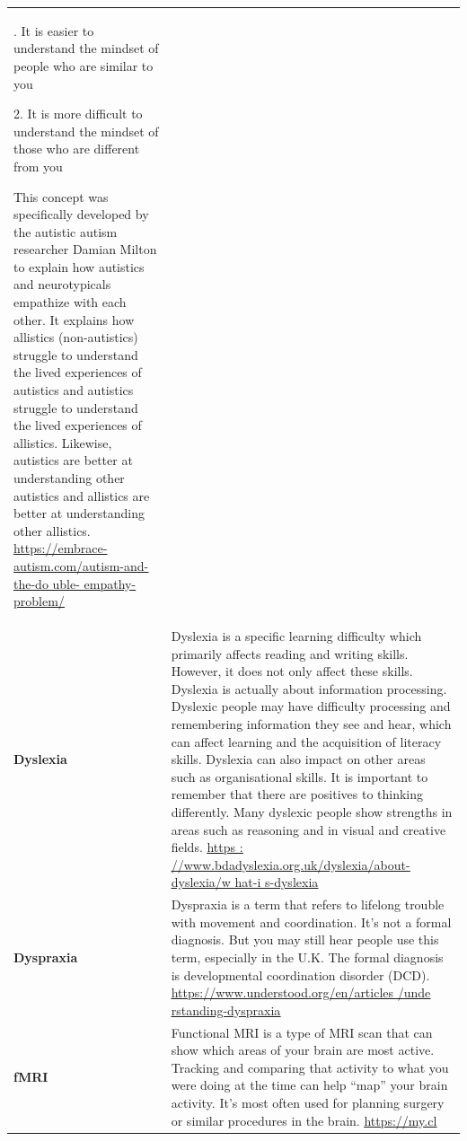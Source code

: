 \documentclass[
  letterpaper,
  DIV=11,
  numbers=noendperiod]{scrreprt}
\begin{document}
\begin{longtable}[]{@{}
  >{\raggedright\arraybackslash}p{}
  >{\raggedright\arraybackslash}p{}@{}}
1. It is easier to understand the mindset of people who are similar to
you

2. It is more difficult to understand the mindset of those who are
different from you

This concept was specifically developed by the autistic autism
researcher Damian Milton to explain how autistics and neurotypicals
empathize with each other. It explains how allistics (non-autistics)
struggle to understand the lived experiences of autistics and autistics
struggle to understand the lived experiences of allistics. Likewise,
autistics are better at understanding other autistics and allistics are
better at understanding other allistics.
\href{https://embrace\%20-\%20autism.com/autism-and-the-double-empathy-problem/}{\uline{https://embrace-autism.com/autism-and-the-do
uble- empathy-problem/}} \\
\textbf{Dyslexia} & Dyslexia is a specific learning difficulty which
primarily affects reading and writing skills. However, it does not only
affect these skills. Dyslexia is actually about information processing.
Dyslexic people may have difficulty processing and remembering
information they see and hear, which can affect learning and the
acquisition of literacy skills. Dyslexia can also impact on other areas
such as organisational skills. It is important to remember that there
are positives to thinking differently. Many dyslexic people show
strengths in areas such as reasoning and in visual and creative fields.
\href{https://www.bdadyslex\%20i\%20a.org.uk/dyslexia/about-dyslexia/what-is-dyslexia}{\uline{https
: //www.bdadyslexia.org.uk/dyslexia/about-dyslexia/w hat-i
s-dyslexia}} \\
\textbf{Dyspraxia} & Dyspraxia is a term that refers to lifelong trouble
with movement and coordination. It's not a formal diagnosis. But you may
still hear people use this term, especially in the U.K. The formal
diagnosis is developmental coordination disorder (DCD).
\href{https://www.\%20u\%20nderstood.org/en/articles/understanding-dyspraxia}{\uline{https://www.understood.org/en/articles
/unde rstanding-dyspraxia}} \\
\textbf{fMRI} & Functional MRI is a type of MRI scan that can show which
areas of your brain are most active. Tracking and comparing that
activity to what you were doing at the time can help ``map'' your brain
activity. It's most often used for planning surgery or similar
procedures in the brain.
\href{https://my.clevelandclini\%20c\%20.org/health/diagnostics/25034-functional-mri-fmri}{\uline{https://my.cl
}}
\end{longtable}
\end{document}
